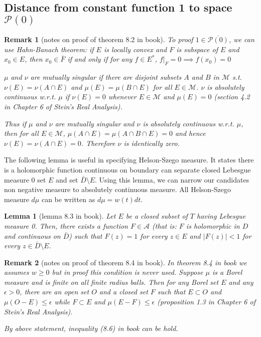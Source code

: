 \documentclass{report}
\newtheorem{remark}{Remark}
\newtheorem{lemma}[theorem]{Lemma}
\numberwithin{theorem}{subsection}
\numberwithin{remark}{subsection}
\newcommand{\abs}[1]{\left\lvert#1\right\rvert}
\begin{document}
\subsection{Distance from constant function 1 to space $\mathscr{P}(0)$}
\begin{remark}[notes on proof of theorem 8.2 in book]
    To proof $1\in\overline{\mathscr{P}(0)}$, we can use Hahn-Banach theorem: if $E$ is locally convex and $F$ is subspace of $E$ and $x_0\in E$, then $x_0\in \bar{F}$ if and only if for
    any $f\in E^*$, $f\vert_F=0 \implies f(x_0)=0$\par
    $\mu$ and $\nu$ are mutually singular if there are disjoint subsets $A$ and $B$ in $\mathscr{M}$ s.t. $\nu(E)=\nu(A\cap E)$ and
    $\mu(E)=\mu(B\cap E)$ for all $E\in\mathscr{M}$. $\nu$ is absolutely continuous w.r.t. $\mu$ if $\nu(E)=0$ whenever $E\in\mathscr{M}$ and $\mu(E)=0$ (section 4.2 in Chapter 6 of Stein’s Real Analysis).\par
    Thus if $\mu$ and $\nu$ are mutually singular and $\nu$ is absolutely continuous w.r.t. $\mu$, then for all $E\in\mathscr{M}$, $\mu(A\cap E)=\mu(A\cap B\cap E)=0$ and hence $\nu(E)=\nu(A\cap E)=0$. Therefore $\nu$ is identically zero.
\end{remark}
The following lemma is useful in specifying Helson-Szego measure. It states there is a holomorphic function continuous on boundary can separate closed Lebesgue measure 0 set $E$ and set $\bar{D}\setminus E$. Using this lemma, we can narrow our candidates non negative measure to absolutely continuous measure. All Helson-Szego measure $d\mu$ can be written as $d\mu=w(t)dt$.\par
\begin{lemma}[lemma 8.3 in book]\label{separate zero measure}
    Let $E$ be a closed subset of $T$ having Lebesgue measure 0. Then, there exists a function $F\in\mathscr{A}$ (that is: $F$ is holomorphic in $D$ and
    continuous on $\bar{D}$) such that $F(z)=1$ for every $z\in E$ and $\abs{F(z)}<1$ for every $z\in\bar{D}\setminus E$.
\end{lemma}
\begin{remark}[notes on proof of theorem 8.4 in book]
    {\color{blue}In theorem 8.4 in book we assumes $w\geq 0$ but in proof this condition is never used}.
    Suppose $\mu$ is a Borel measure and is finite on all finite radius balls. Then for any Borel set $E$ and any $\epsilon>0$, there are an open
    set $O$ and a closed set $F$ such that $E\subset O$ and $\mu(O-E)\leq\epsilon$ while $F\subset E$ and $\mu(E-F)\leq\epsilon$ (proposition 1.3 in Chapter 6 of Stein’s Real Analysis).\par
    By above statement, inequality (8.6) in book can be hold.\par
\end{remark}
\end{document}

